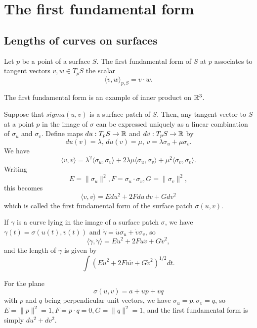 \section{The first fundamental form}

\subsection{Lengths of curves on surfaces}

\begin{defn}
  Let $p$ be a point of a surface $S$.
  The first fundamental form of $S$ at $p$
  associates to tangent vectors $v, w \in T_p S$ the scalar
  \[
    \langle v, w \rangle_{p, S} = v \cdot w.
  \]
\end{defn}

\begin{remark}
  The first fundamental form is an example of inner product on $\mathbb{R}^3$.
\end{remark}

Suppose that $sigma(u, v)$ is a surface patch of $S$.
Then, any tangent vector to $S$ at a point $p$ in the image of $\sigma$
can be expressed uniquely as a linear combination of $\sigma_u$ and $\sigma_v$.
Define maps $du: T_p S \to \mathbb{R}$ and $dv: T_p S \to \mathbb{R}$ by
\[
  du(v) = \lambda, \, du(v) = \mu, \, v = \lambda \sigma_u + \mu \sigma_v.
\]
We have
\[
  \langle v, v \rangle = \lambda^2 \langle \sigma_u, \sigma_v \rangle +
  2 \lambda \mu \langle \sigma_u, \sigma_v \rangle +
  \mu^2 \langle \sigma_v, \sigma_v \rangle.  
\]
Writing
\[
  E = \|\sigma_u\|^2,
  F = \sigma_u \cdot \sigma_v,
  G = \|\sigma_v\|^2,
\]
this becomes
\[
  \langle v, v \rangle =
  E du^2 + 2 F du\, dv   + G dv^2
\]
which is called the first fundamental form of the surface patch $\sigma(u, v)$.

If $\gamma$ is a curve lying in the image of a surface patch $\sigma$, we have
$\gamma(t) = \sigma(u(t), v(t))$ and
$\dot{\gamma} = \dot{u} \sigma_u + \dot{v} \sigma_v$, so
\[
  \langle \dot{\gamma}, \dot{\gamma} \rangle =
  E \dot{u}^2 + 2 F \dot{u} \dot{v} + G \dot{v}^2,
\]
and the length of $\gamma$ is given by
\[
  \int (E \dot{u}^2 + 2 F \dot{u} \dot{v} + G \dot{v}^2)^{1/2}dt.
\]

\begin{example}
  For the plane
  \[
    \sigma(u, v) = a + up + vq  
  \]
  with $p$ and $q$ being perpendicular unit vectors, we have
  $\sigma_u = p, \sigma_v = q$, so
  $E = \|p\|^2 = 1,
  F = p \cdot q = 0,
  G = \|q\|^2 = 1$,
  and the first fundamental form is simply
  $du^2 + dv^2$.
\end{example}